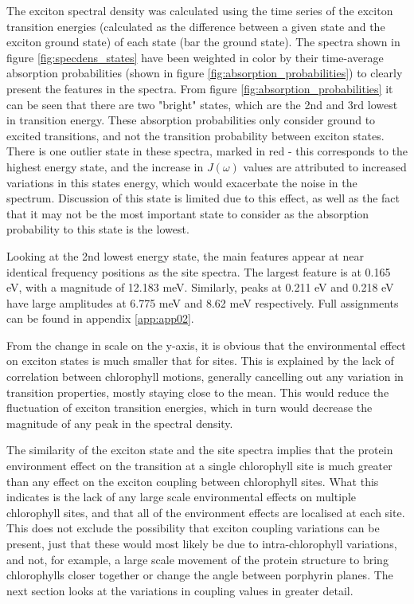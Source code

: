 The exciton spectral density was calculated using the time series of the exciton
transition energies (calculated as the difference between a given state and the
exciton ground state) of each state (bar the ground state). The spectra shown in 
figure \ref{fig:specdens_states} have been weighted in color by their time-average
absorption probabilities (shown in figure \ref{fig:absorption_probabilities}) to
clearly present the features in the spectra. From figure \ref{fig:absorption_probabilities}
it can be seen that there are two "bright" states, which are the 2nd and 3rd lowest
in transition energy. These absorption probabilities only consider ground to excited 
transitions, and not the transition probability between exciton states. There is
one outlier state in these spectra, marked in red - this corresponds to the highest
energy state, and the increase in $J\left(\omega\right)$ values are attributed to 
increased variations in this states energy, which would exacerbate the noise in 
the spectrum. Discussion of this state is limited due to this effect, as well as 
the fact that it may not be the most important state to consider as the absorption
probability to this state is the lowest.

Looking at the 2nd lowest energy state, the main features appear at near identical
frequency positions as the site spectra. The largest feature is at 0.165 eV, with
a magnitude of 12.183 meV. Similarly, peaks at 0.211 eV and 0.218 eV have large
amplitudes at 6.775 meV and 8.62 meV respectively. Full assignments can be found
in appendix \ref{app:app02}.

From the change in scale on the y-axis, it is obvious that the environmental effect
on exciton states is much smaller that for sites. This is explained by the lack
of correlation between chlorophyll motions, generally cancelling out any variation
in \Qy transition properties, mostly staying close to the mean. This would reduce
the fluctuation of exciton transition energies, which in turn would decrease the
magnitude of any peak in the spectral density.

The similarity of the exciton state and the site spectra implies that the protein
environment effect on the transition at a single chlorophyll site is much greater 
than any effect on the exciton coupling between chlorophyll sites. What this indicates
is the lack of any large scale environmental effects on multiple chlorophyll sites,
and that all of the environment effects are localised at each site. This does not 
exclude the possibility that exciton coupling variations can be present, just that
these would most likely be due to intra-chlorophyll variations, and not, for example,
a large scale movement of the protein structure to bring chlorophylls closer together
or change the angle between porphyrin planes. The next section looks at the variations
in coupling values in greater detail.

